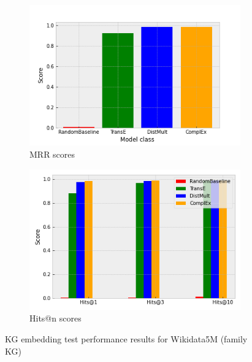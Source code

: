 \begin{figure}[h]
\centering
\begin{subfigure}{.5\textwidth}
  \centering
  \includegraphics[width=1\linewidth]{figures/model_selection/family_mrr.png}
  \caption{MRR scores}
  \label{fig:sub1}
\end{subfigure}%
\begin{subfigure}{.5\textwidth}
  \centering
  \includegraphics[width=1\linewidth]{figures/model_selection/family_hit_scores.png}
  \caption{Hits@n scores}
  \label{fig:sub2}
\end{subfigure}
\caption{KG embedding test performance results for Wikidata5M (family KG)}
\label{fig:test}
\end{figure}


